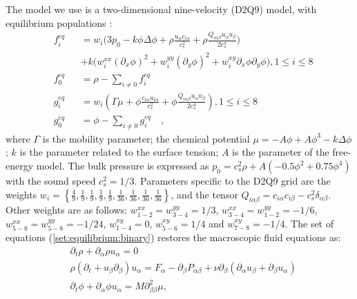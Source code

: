 \documentclass[preprint,12pt]{elsarticle}
\begin{document}
The model we use is a two-dimensional nine-velocity (D2Q9) model,
with equilibrium populations \cite{pooley-contact}:
\begin{equation}
\label{set:equilibrium:binary}
\begin{aligned}
&f_i^{eq}&&=w_i 
\biggl(3
p_0 - k \phi \Delta \phi
+\rho\frac{u_{\alpha}c_{i\alpha}}{c_s^2}+\rho \frac{Q_{i\alpha\beta}u_{\alpha } u_ {
\beta}}{2 c_s^4}\biggr)\\
&&&+k\bigl(w_i^{xx} (\partial_x \phi)^2+w_i^{yy} (\partial_y \phi)^2 +w_i^{xy} \partial_x
\phi \partial_y \phi \bigr), 1\leq i \leq 8\\
&f_0^{eq}&&=\rho-\sum_{i\neq0}{f_i^{eq}}\\
&g_i^{eq}&&=w_i\left(\Gamma \mu + \phi\frac{ c_{i\alpha} u_{i\alpha}}{c_s^2}+\phi
\frac{Q_{i\alpha\beta}u_{\alpha}u_{\beta}}{2 c_s^4}\right), 1\leq i \leq 8 \\
&g_0^{eq}&&=\phi-\sum_{i\neq0}{g_i^{eq}}\quad,
\end{aligned}
\end{equation}
where $\Gamma$ is the mobility parameter; the chemical potential
$\mu=-A\phi+A\phi^3-k\Delta\phi$; $k$ is the parameter related to the surface
tension; $A$ is the parameter of the free-energy model. The bulk pressure
is expressed as $p_0=c_s^2 \rho +A (-0.5 \phi^2+0.75 \phi^4)$ {\color{red} with
the sound speed $c_s^2=1/3$}. 
Parameters specific to the D2Q9 grid are the weights
$w_i=\left\{\frac{4}{9},\frac{1}{9},\frac{1}{9},\frac{1}{9},\frac{1}{9},
\frac{1}{36},\frac{1}{36},\frac{1}{36},\frac{1}{36}\right\}$, and the tensor
$Q_{i\alpha\beta}=c_{i\alpha} c_{i\beta} - c_s^2 \delta_{\alpha\beta}$.  
{\color{red}
Other weights 
are as follows:}
$w^{xx}_{1-2}=w^{yy}_{3-4}=1/3$, $w^{xx}_{3-4}=w^{yy}_{1-2}=-1/6$,
$w^{xx}_{5-8}=w^{yy}_{5-8}=-1/24$, $w^{xy}_{1-4}=0$, $w^{xy}_{5-6}=1/4$ and
$w^{xy}_{7-8}=-1/4$. The set of equations (\ref{set:equilibrium:binary}) restores the
macroscopic
fluid equations as:
\begin{equation}
\begin{aligned}
&\partial_t \rho+ \partial_{\alpha} \rho u_{\alpha}=0\\
&\rho\left(\partial_t+u_{\beta}\partial_{\beta}\right) u_{\alpha}= F_{\alpha}
-\partial_{\beta}P_{\alpha \beta} +
\nu\partial_{\beta}\left(\partial_{\alpha}u_{\beta}+\partial_{\beta} u_{\alpha}\right)\\
&\partial_t \phi + \partial_{\alpha} \phi u_{\alpha}=M \partial^2_{\beta\beta} \mu,
\end{aligned}
\label{binary:fluid:system}
\end{equation}
\end{document}
